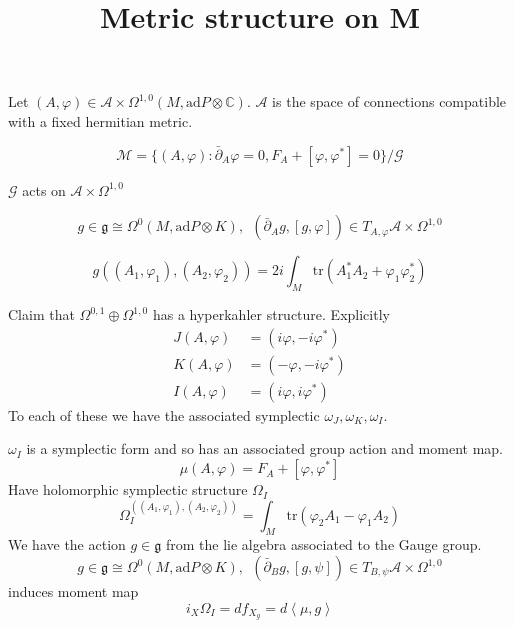 % 


\title{Metric structure on M}
\author{}
\date{}

 
\maketitle

Let $ ( A , \varphi) \in \mathcal{A} \times \Omega ^{1,0} ( M, \mathrm{ad} P \otimes \mathbb{C} ) $.
$\mathcal{A} $ is the space of connections compatible with a fixed hermitian metric. 

\begin{equation}
    \mathcal{M} = \{ ( A, \varphi) : \bar{\partial} _A \varphi = 0 , F_A + [\varphi, \varphi^*] = 0 \} / \mathcal{G}
\end{equation}

$\mathcal{G} $ acts on $ \mathcal{A} \times \Omega^{1,0} $ 


\begin{equation}
    g \in \mathfrak{g} \cong \Omega^0 (M, \mathrm{ad}P \otimes K ) ,~~ ( \bar{\partial}_A g, [g, \varphi]) \in T_{A, \varphi} \mathcal{A} \times \Omega^{1,0} 
\end{equation}

\begin{equation}
    g((A_1, \varphi_1) , (A_2, \varphi_2)) = 2i \int _M \mathrm{tr} ( A_1 ^* A_2 + \varphi_1 \varphi_2 ^* ) 
\end{equation}


Claim that $ \Omega^{0,1} \oplus \Omega^{1,0} $ has a hyperkahler structure. 
Explicitly 
\begin{align}
    J(A, \varphi) & = (i \varphi, -i \varphi^*) \\ 
    K(A, \varphi) & = (- \varphi, -i \varphi^*) \\ 
    I(A, \varphi) & = (i \varphi, i \varphi^*) 
\end{align}
To each of these we have the associated symplectic $\omega_J, \omega_K, \omega_I$.

$\omega_I$ is a symplectic form and so has an associated group action and moment map.
\begin{equation}
    \mu(A, \varphi) = F_A + [\varphi, \varphi^*] 
\end{equation}
Have holomorphic symplectic structure $\Omega_I$ 
\begin{equation}
    \Omega_I ^{((A_1, \varphi_1), (A_2, \varphi_2))} = \int_M \mathrm{tr}(\varphi_2 A_1 - \varphi_1 A_2) 
\end{equation}
We have the action $g \in \mathfrak{g} $ from the lie algebra associated to the Gauge group. 
\begin{equation}
    g \in \mathfrak{g} \cong \Omega^0 (M, \mathrm{ad}P \otimes K ) ,~~ ( \bar{\partial}_B g, [g, \psi]) \in T_{B, \psi} \mathcal{A} \times \Omega^{1,0} 
\end{equation}
induces moment map
\begin{equation}
    i_X \Omega_I = d f_{X_g} = d \left< \mu, g \right> 
\end{equation}

